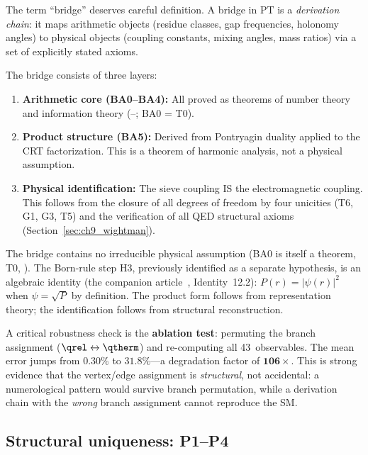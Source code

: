 \documentclass[12pt,a4paper]{article}
\begin{document}
The term ``bridge'' deserves careful definition. A bridge in PT is
a \emph{derivation chain}: it maps arithmetic objects
(residue classes, gap frequencies, holonomy angles) to physical
objects (coupling constants, mixing angles, mass ratios) via
a set of explicitly stated axioms.

The bridge consists of three layers:
\begin{enumerate}[nosep]
\item \textbf{Arithmetic core (BA0--BA4):} All proved as theorems of
  number theory and information theory (\cite{companion_M1}--\cite{companion_M3}; BA0 = T0).
\item \textbf{Product structure (BA5):} Derived from Pontryagin
  duality applied to the CRT factorization. This is a theorem of
  harmonic analysis, not a physical assumption.
\item \textbf{Physical identification:} The sieve coupling IS the
  electromagnetic coupling. This follows from the closure of all
  degrees of freedom by four unicities (T6, G1, G3, T5) and the
  verification of all QED structural axioms (Section~\ref{sec:ch9_wightman}).
\end{enumerate}

The bridge
contains no irreducible physical assumption (BA0 is itself
a theorem, T0, \cite{companion_M3}).
The Born-rule step H3, previously identified as a separate hypothesis,
is an algebraic identity (the companion article~\cite{companion_physics}, Identity~12.2): $P(r) = |\psi(r)|^2$
when $\psi = \sqrt{P}$ by definition. The product form follows from
representation theory; the identification follows from structural
reconstruction.

\begin{remark}
\label{rem:ablation}
A critical robustness check is the \textbf{ablation test}: permuting
the branch assignment ($\qrel \leftrightarrow \qtherm$) and
re-computing all 43~observables.  The mean error jumps from
$0.30\%$ to $31.8\%$---a degradation factor of $\mathbf{106\times}$.
This is strong evidence that the vertex/edge assignment is
\emph{structural}, not accidental: a numerological pattern would
survive branch permutation, while a derivation chain with the
\emph{wrong} branch assignment cannot reproduce the SM.
\end{remark}

\subsection{Structural uniqueness: P1--P4}
\label{sec:ch9_P1P4}
\end{document}
